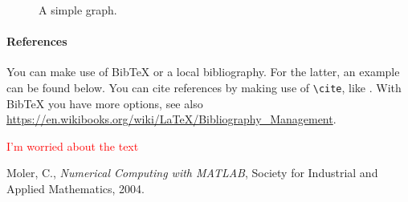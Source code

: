 \documentclass[a4paper,11pt]{article}
\newcommand\myworries[1]{\textcolor{red}{#1}}
\begin{document}
\begin{figure}[!htpb]
\centering
{
}
\caption{A simple graph.
\label{fig:simplegraph}}
\end{figure}

\paragraph{References}
You can make use of BibTeX or a local bibliography. For the latter, an example can be found below. You can cite references by making use of \texttt{\textbackslash cite}, like \cite{cmoler2004}. With BibTeX you have more options, see also \url{https://en.wikibooks.org/wiki/LaTeX/Bibliography_Management}.

\myworries{I'm worried about the text}

\newpage
\begin{thebibliography}{99} 
  Moler, C.,
  \emph{Numerical Computing with MATLAB},
  Society for Industrial and Applied Mathematics,
  2004.

\end{thebibliography}
\end{document}

